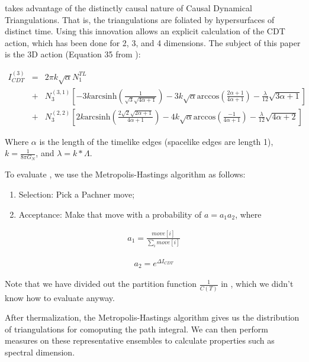 \documentclass[12pt]{article}
\begin{document}
 takes advantage of the distinctly causal nature of Causal Dynamical Triangulations. That is, the triangulations are foliated by hypersurfaces of distinct time.
Using this innovation allows an explicit calculation of the CDT action, which has been done for 2, 3, and 4 dimensions. The subject of this paper is the 3D action (Equation 35 from \cite{j._ambjorn_dynamically_2001}):

\begin{eqnarray*}
  I_{CDT}^{(3)} &=& 2\pi k\sqrt{\alpha}N_1^{TL} \\
    &+& N_3^{(3,1)}\left[-3k\text{arcsinh}\left(\frac{1}{\sqrt{3}
    \sqrt{4\alpha +1}}\right)-3k\sqrt{\alpha}\text{arccos}\left(\frac{2\alpha+1}
    {4\alpha+1}\right)-\frac{\lambda}{12}\sqrt{3\alpha+1}\right] \\
    &+& N_3^{(2,2)}\left[2k\text{arcsinh}\left(\frac{2\sqrt{2}\sqrt{2\alpha+1}}
    {4\alpha +1}\right)-4k\sqrt{\alpha}\text{arccos}\left(\frac{-1}{4\alpha+1}
    \right)-\frac{\lambda}{12}\sqrt{4\alpha +2}\right]\label{CDT2}
\end{eqnarray*}

Where $\alpha$ is the length of the timelike edges (spacelike edges are length 1), $k=\frac{1}{8\pi G_{N}}$, and $\lambda=k*\Lambda$.

To evaluate , we use the Metropolis-Hastings algorithm as follows:\\[-4ex]
\begin{enumerate}\addtolength{\itemsep}{-1.5ex}
\item Selection: Pick a Pachner move;  
\item Acceptance: Make that move with a probability of $a=a_1a_2$, where
\end{enumerate}
\vspace*{-1ex}

\begin{align}
  a_{1}=\frac{move[i]}{\sum\limits_{i}move[i]}
\end{align}

\begin{align}
  a_{2}=e^{\Delta I_{CDT}}
\end{align}

Note that we have divided out the partition function $\frac{1}{C(T)}$ in , which we didn't know how to evaluate anyway.

After thermalization, the Metropolis-Hastings algorithm gives us the distribution of triangulations for comoputing the path integral. We can then perform measures
on these representative ensembles to calculate properties such as spectral dimension.\cite{j._ambjorn_spectral_nodate,sotiriou_spectral_2011}
\end{document}
